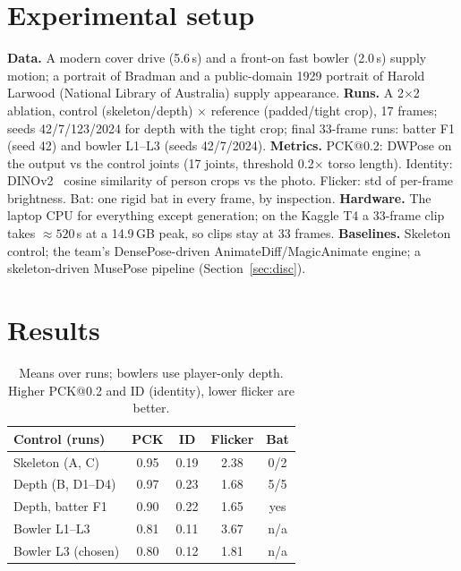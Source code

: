 \documentclass[11pt,a4paper,twocolumn]{article}
\begin{document}
\section{Experimental setup}
\textbf{Data.} A modern cover drive (5.6\,s) and a front-on fast bowler (2.0\,s) supply motion; a portrait of
Bradman and a public-domain 1929 portrait of Harold Larwood (National Library of Australia) supply appearance.
\textbf{Runs.} A 2$\times$2 ablation, control (skeleton/depth) $\times$ reference (padded/tight crop), 17
frames; seeds 42/7/123/2024 for depth with the tight crop; final 33-frame runs: batter F1 (seed 42) and bowler
L1--L3 (seeds 42/7/2024). \textbf{Metrics.} PCK@0.2: DWPose on the output vs the control joints (17 joints,
threshold 0.2$\times$ torso length). Identity: DINOv2~\cite{dinov2} cosine similarity of person crops vs the
photo. Flicker: std of per-frame brightness. Bat: one rigid bat in every frame, by inspection.
\textbf{Hardware.} The laptop CPU for everything except generation; on the Kaggle T4 a 33-frame clip takes
${\approx}520$\,s at a 14.9\,GB peak, so clips stay at 33 frames. \textbf{Baselines.} Skeleton
control; the team's DensePose-driven \mbox{AnimateDiff}/MagicAnimate engine; a skeleton-driven MusePose
pipeline (Section~\ref{sec:disc}).

\section{Results}
\begin{table}[h]
\centering
\small
\begin{tabular}{lcccc}
\toprule
Control (runs) & PCK & ID & Flicker & Bat \\
\midrule
Skeleton (A, C) & 0.95 & 0.19 & 2.38 & 0/2 \\
Depth (B, D1--D4) & 0.97 & 0.23 & 1.68 & 5/5 \\
\midrule
Depth, batter F1 & 0.90 & 0.22 & 1.65 & yes \\
Bowler L1--L3 & 0.81 & 0.11 & 3.67 & n/a \\
Bowler L3 (chosen) & 0.80 & 0.12 & 1.81 & n/a \\
\bottomrule
\end{tabular}
\caption{Means over runs; bowlers use player-only depth. Higher PCK@0.2 and ID (identity), lower flicker are
better.}
\label{tab:results}
\end{table}
\end{document}
